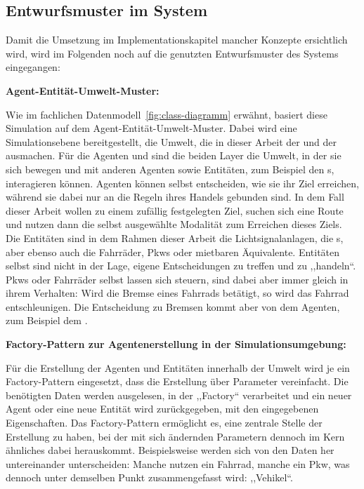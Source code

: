 %

\subsection{Entwurfsmuster im System}\label{subsec:design-pattern}

Damit die Umsetzung im Implementationskapitel mancher Konzepte ersichtlich wird, wird im Folgenden noch auf die genutzten Entwurfsmuster des Systems eingegangen:

\textbf{Agent-Entität-Umwelt-Muster:}

Wie im fachlichen Datenmodell~\ref{fig:class-diagramm} erwähnt, basiert diese Simulation auf dem Agent-Entität-Umwelt-Muster.
Dabei wird eine Simulationsebene bereitgestellt, die Umwelt, die in dieser Arbeit der  und der  ausmachen.
Für die Agenten  und  sind die beiden Layer die Umwelt, in der sie sich bewegen und mit anderen Agenten sowie Entitäten, zum Beispiel den s, interagieren können.
Agenten können selbst entscheiden, wie sie ihr Ziel erreichen, während sie dabei nur an die Regeln ihres Handels gebunden sind.
In dem Fall dieser Arbeit wollen  zu einem zufällig festgelegten Ziel, suchen sich eine Route und nutzen dann die selbst ausgewählte Modalität zum Erreichen dieses Ziels.
Die Entitäten sind in dem Rahmen dieser Arbeit die Lichtsignalanlagen, die s, aber ebenso auch die Fahrräder, Pkws oder mietbaren Äquivalente.
Entitäten selbst sind nicht in der Lage, eigene Entscheidungen zu treffen und zu ,,handeln``.
Pkws oder Fahrräder selbst lassen sich steuern, sind dabei aber immer gleich in ihrem Verhalten:
Wird die Bremse eines Fahrrads betätigt, so wird das Fahrrad entschleunigen.
Die Entscheidung zu Bremsen kommt aber von dem Agenten, zum Beispiel dem .

\textbf{Factory-Pattern zur Agentenerstellung in der Simulationsumgebung:}

Für die Erstellung der Agenten und Entitäten innerhalb der Umwelt wird je ein Factory-Pattern eingesetzt, dass die Erstellung über Parameter vereinfacht.
Die benötigten Daten werden ausgelesen, in der ,,Factory`` verarbeitet und ein neuer Agent oder eine neue Entität wird zurückgegeben, mit den eingegebenen Eigenschaften.
Das Factory-Pattern ermöglicht es, eine zentrale Stelle der Erstellung zu haben, bei der mit sich ändernden Parametern dennoch im Kern ähnliches dabei herauskommt.
Beispielsweise werden  sich von den Daten her untereinander unterscheiden: Manche nutzen ein Fahrrad, manche ein Pkw, was dennoch unter demselben Punkt zusammengefasst wird: ,,Vehikel``.
